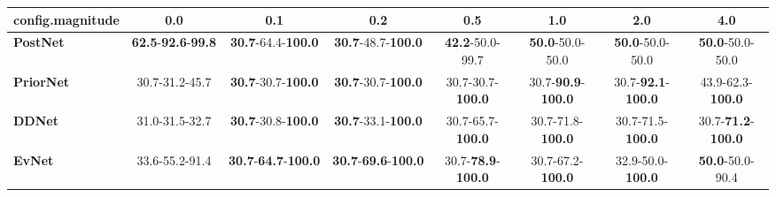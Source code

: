 \begin{tabular}{lccccccc}
\toprule
\textbf{config.magnitude} &                                        0.0 &                                         0.1 &                                         0.2 &                                0.5 &                                1.0 &                                2.0 &                                4.0 \\
\midrule
\textbf{PostNet } &  \textbf{62.5}-\textbf{92.6}-\textbf{99.8} &           \textbf{30.7}-64.4-\textbf{100.0} &           \textbf{30.7}-48.7-\textbf{100.0} &            \textbf{42.2}-50.0-99.7 &            \textbf{50.0}-50.0-50.0 &            \textbf{50.0}-50.0-50.0 &            \textbf{50.0}-50.0-50.0 \\
\textbf{PriorNet} &                             30.7-31.2-45.7 &           \textbf{30.7}-30.7-\textbf{100.0} &           \textbf{30.7}-30.7-\textbf{100.0} &           30.7-30.7-\textbf{100.0} &  30.7-\textbf{90.9}-\textbf{100.0} &  30.7-\textbf{92.1}-\textbf{100.0} &           43.9-62.3-\textbf{100.0} \\
\textbf{DDNet   } &                             31.0-31.5-32.7 &           \textbf{30.7}-30.8-\textbf{100.0} &           \textbf{30.7}-33.1-\textbf{100.0} &           30.7-65.7-\textbf{100.0} &           30.7-71.8-\textbf{100.0} &           30.7-71.5-\textbf{100.0} &  30.7-\textbf{71.2}-\textbf{100.0} \\
\textbf{EvNet   } &                             33.6-55.2-91.4 &  \textbf{30.7}-\textbf{64.7}-\textbf{100.0} &  \textbf{30.7}-\textbf{69.6}-\textbf{100.0} &  30.7-\textbf{78.9}-\textbf{100.0} &           30.7-67.2-\textbf{100.0} &           32.9-50.0-\textbf{100.0} &            \textbf{50.0}-50.0-90.4 \\
\bottomrule
\end{tabular}
